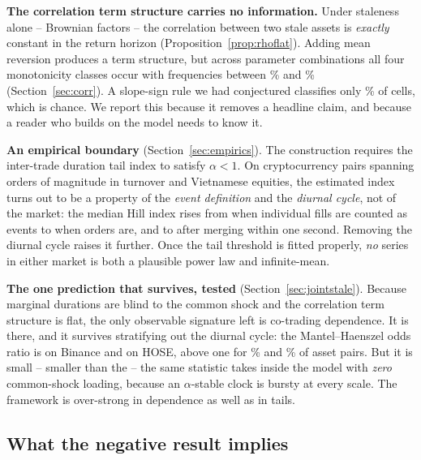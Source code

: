 \documentclass{ws-ijtaf}
\begin{document}
\begin{arabiclist}
\item \textbf{The correlation term structure carries no information.} Under
staleness alone -- Brownian factors -- the correlation between two stale assets
is \emph{exactly} constant in the return horizon
(Proposition~\ref{prop:rhoflat}). Adding mean reversion produces a term
structure, but across \sweepN{} parameter combinations all four monotonicity
classes occur with frequencies between \shareRising{}\% and \shareHump{}\%
(Section~\ref{sec:corr}). A slope-sign rule we had conjectured classifies only
\slopeRuleAcc{}\% of cells, which is chance. We report this because it removes a
headline claim, and because a reader who builds on the model needs to know it.

\item \textbf{An empirical boundary} (Section~\ref{sec:empirics}). The
construction requires the inter-trade duration tail index to satisfy
$\alpha<1$. On \cryptoNsym{} cryptocurrency pairs spanning \cryptoVolDecades{}
orders of magnitude in turnover and \hoseNsym{} Vietnamese equities, the
estimated index turns out to be a property of the \emph{event definition} and
the \emph{diurnal cycle}, not of the market: the median Hill index rises from
\cryptoAlphaFillMed{} when individual fills are counted as events to
\cryptoAlphaOrderMed{} when orders are, and to \cryptoAlphaWbMed{} after merging
within one second. Removing the diurnal cycle raises it further. Once the tail
threshold is fitted properly, \emph{no} series in either market is both a
plausible power law and infinite-mean.

\item \textbf{The one prediction that survives, tested}
(Section~\ref{sec:jointstale}). Because marginal durations are blind to the
common shock and the correlation term structure is flat, the only observable
signature left is co-trading dependence. It is there, and it survives
stratifying out the diurnal cycle: the Mantel--Haenszel odds ratio is
\jsCryMH{} on Binance and \jsHosMH{} on HOSE, above one for \jsCryAbove{}\%
and \jsHosAbove{}\% of asset pairs. But it is small -- smaller than the
\benchNullLo{}--\benchNullHi{} the same statistic takes inside the model with
\emph{zero} common-shock loading, because an $\alpha$-stable clock is bursty at
every scale. The framework is over-strong in dependence as well as in tails.
\end{arabiclist}

\subsection{What the negative result implies}
\end{document}
